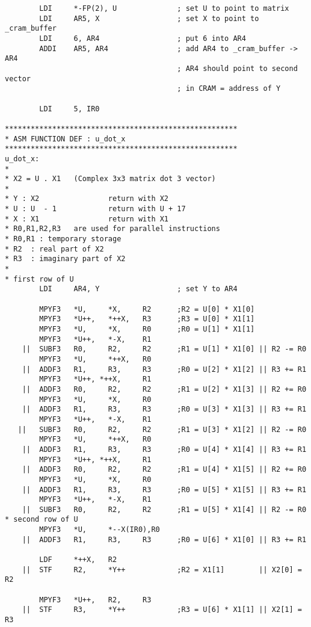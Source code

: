 {\begin{verbatim}
        LDI     *-FP(2), U              ; set U to point to matrix
        LDI     AR5, X                  ; set X to point to _cram_buffer
        LDI     6, AR4                  ; put 6 into AR4
        ADDI    AR5, AR4                ; add AR4 to _cram_buffer -> AR4
                                        ; AR4 should point to second vector
                                        ; in CRAM = address of Y

        LDI     5, IR0

******************************************************
* ASM FUNCTION DEF : u_dot_x
******************************************************
u_dot_x:
*
* X2 = U . X1   (Complex 3x3 matrix dot 3 vector)
* 
* Y : X2                return with X2
* U : U  - 1            return with U + 17
* X : X1                return with X1
* R0,R1,R2,R3   are used for parallel instructions
* R0,R1 : temporary storage
* R2  : real part of X2
* R3  : imaginary part of X2
*
* first row of U
        LDI     AR4, Y                  ; set Y to AR4

        MPYF3   *U,     *X,     R2      ;R2 = U[0] * X1[0]
        MPYF3   *U++,   *++X,   R3      ;R3 = U[0] * X1[1]
        MPYF3   *U,     *X,     R0      ;R0 = U[1] * X1[1]
        MPYF3   *U++,   *-X,    R1
    ||  SUBF3   R0,     R2,     R2      ;R1 = U[1] * X1[0] || R2 -= R0
        MPYF3   *U,     *++X,   R0
    ||  ADDF3   R1,     R3,     R3      ;R0 = U[2] * X1[2] || R3 += R1
        MPYF3   *U++, *++X,     R1
    ||  ADDF3   R0,     R2,     R2      ;R1 = U[2] * X1[3] || R2 += R0
        MPYF3   *U,     *X,     R0
    ||  ADDF3   R1,     R3,     R3      ;R0 = U[3] * X1[3] || R3 += R1
        MPYF3   *U++,   *-X,    R1
   ||  	SUBF3   R0,     R2,     R2      ;R1 = U[3] * X1[2] || R2 -= R0
        MPYF3   *U,     *++X,   R0
    ||  ADDF3   R1,     R3,     R3      ;R0 = U[4] * X1[4] || R3 += R1
        MPYF3   *U++, *++X,     R1
    ||  ADDF3   R0,     R2,     R2      ;R1 = U[4] * X1[5] || R2 += R0
        MPYF3   *U,     *X,     R0
    ||  ADDF3   R1,     R3,     R3      ;R0 = U[5] * X1[5] || R3 += R1
        MPYF3   *U++,   *-X,    R1
    ||  SUBF3   R0,     R2,     R2      ;R1 = U[5] * X1[4] || R2 -= R0
* second row of U
        MPYF3   *U,     *--X(IR0),R0
    ||  ADDF3   R1,     R3,     R3      ;R0 = U[6] * X1[0] || R3 += R1

        LDF     *++X,   R2
    ||  STF     R2,     *Y++            ;R2 = X1[1]        || X2[0] = R2

        MPYF3   *U++,   R2,     R3
    ||  STF     R3,     *Y++            ;R3 = U[6] * X1[1] || X2[1] = R3


\end{verbatim}}
